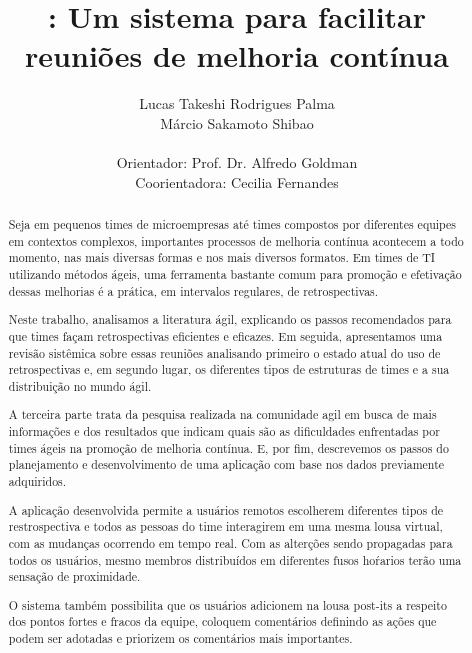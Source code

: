 \documentclass[titlepage, 12pt]{article}
\title{\suricato: Um sistema para facilitar reuniões de melhoria contínua}
\author{Lucas Takeshi Rodrigues Palma\\Márcio Sakamoto Shibao\\ \\Orientador: Prof. Dr. Alfredo Goldman\\Coorientadora: Cecilia Fernandes}
\begin{document}
	

\maketitle

\begin{abstract}
Seja em pequenos times de microempresas até times compostos por diferentes equipes em contextos complexos, importantes processos de melhoria contínua acontecem a todo momento, nas mais diversas formas e nos mais diversos formatos. Em times de TI utilizando métodos ágeis, uma ferramenta bastante comum para promoção e efetivação dessas melhorias é a prática, em intervalos regulares, de retrospectivas.

Neste trabalho, analisamos a literatura ágil, explicando os passos recomendados para que times façam retrospectivas eficientes e eficazes. Em seguida, apresentamos uma revisão sistêmica sobre essas reuniões analisando primeiro o estado atual do uso de retrospectivas e, em segundo lugar, os diferentes tipos de estruturas de times e a sua distribuição no mundo ágil.

A terceira parte trata da pesquisa realizada na comunidade agil em busca de mais informações e dos resultados que indicam quais são as dificuldades enfrentadas por times ágeis na promoção de melhoria contínua. E, por fim, descrevemos os passos do planejamento e desenvolvimento de uma aplicação com base nos dados previamente adquiridos.

A aplicação desenvolvida permite a usuários remotos escolherem diferentes tipos de restrospectiva e todos as pessoas do time interagirem em uma mesma lousa virtual, com as mudanças ocorrendo em tempo real. Com as alterções sendo propagadas para todos os usuários, mesmo membros distribuídos em diferentes fusos hoŕarios terão uma sensação de
proximidade.

O sistema também possibilita que os usuários adicionem na lousa post-its a respeito dos pontos fortes e fracos da equipe, coloquem comentários definindo as ações que podem ser adotadas e priorizem os comentários mais importantes.




\end{abstract}
\end{document}
